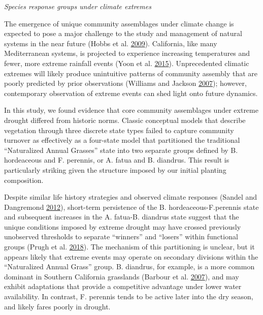 \documentclass[twoside,12pt,final]{ucthesis-CA2012}
\begin{document}
\begin{ucmainmatter}
\emph{Species response groups under climate extremes}

The emergence of unique community assemblages under climate change is expected to pose a major challenge to the study and management of natural systems in the near future (Hobbs et al. \protect\hyperlink{ref-Hobbs2009}{2009}).
California, like many Mediterranean systems, is projected to experience increasing temperatures and fewer, more extreme rainfall events (Yoon et al. \protect\hyperlink{ref-Yoon2015}{2015}).
Unprecedented climatic extremes will likely produce unintuitive patterns of community assembly that are poorly predicted by prior observations (Williams and Jackson \protect\hyperlink{ref-Williams2007}{2007}); however, contemporary observation of extreme events can shed light onto future dynamics.

In this study, we found evidence that core community assemblages under extreme drought differed from historic norms.
Classic conceptual models that describe vegetation through three discrete state types failed to capture community turnover as effectively as a four-state model that partitioned the traditional ``Naturalized Annual Grasses'' state into two separate groups defined by B. hordeaceous and F. perennis, or A. fatua and B. diandrus.
This result is particularly striking given the structure imposed by our initial planting composition.

Despite similar life history strategies and observed climate responses (Sandel and Dangremond \protect\hyperlink{ref-Sandel2012}{2012}), short-term persistence of the B. hordeaceous-F.perennis state and subsequent increases in the A. fatua-B. diandrus state suggest that the unique conditions imposed by extreme drought may have crossed previously unobserved thresholds to separate ``winners'' and ``losers'' within functional groups (Prugh et al. \protect\hyperlink{ref-Prugh2018}{2018}).
The mechanism of this partitioning is unclear, but it appears likely that extreme events may operate on secondary divisions within the ``Naturalized Annual Grass'' group.
B. diandrus, for example, is a more common dominant in Southern California grasslands (Barbour et al. \protect\hyperlink{ref-Barbour2007}{2007}), and may exhibit adaptations that provide a competitive advantage under lower water availability.
In contrast, F. perennis tends to be active later into the dry season, and likely fares poorly in drought.


\end{ucmainmatter}
\end{document}
